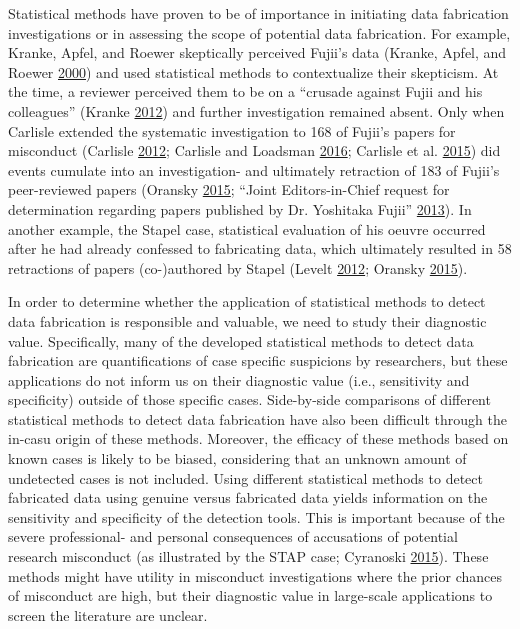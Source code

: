 \documentclass[a5paper]{book}
\begin{document}
Statistical methods have proven to be of importance in initiating data
fabrication investigations or in assessing the scope of potential data
fabrication. For example, Kranke, Apfel, and Roewer skeptically
perceived Fujii's data (Kranke, Apfel, and Roewer
\protect\hyperlink{ref-doi:10.1213ux2f00000539-200004000-00053}{2000})
and used statistical methods to contextualize their skepticism. At the
time, a reviewer perceived them to be on a \enquote{crusade against
Fujii and his colleagues} (Kranke
\protect\hyperlink{ref-doi:10.1111ux2fj.1365-2044.2012.07318.x}{2012})
and further investigation remained absent. Only when Carlisle extended
the systematic investigation to 168 of Fujii's papers for misconduct
(Carlisle
\protect\hyperlink{ref-doi:10.1111ux2fj.1365-2044.2012.07128.x}{2012};
Carlisle and Loadsman
\protect\hyperlink{ref-doi:10.1111ux2fanae.13650}{2016}; Carlisle et al.
\protect\hyperlink{ref-doi:10.1111ux2fanae.13126}{2015}) did events
cumulate into an investigation- and ultimately retraction of 183 of
Fujii's peer-reviewed papers (Oransky
\protect\hyperlink{ref-oransky2015}{2015}; ``Joint Editors-in-Chief
request for determination regarding papers published by Dr. Yoshitaka
Fujii''
\protect\hyperlink{ref-doi:10.1016ux2fj.ijoa.2012.10.001}{2013}). In
another example, the Stapel case, statistical evaluation of his oeuvre
occurred after he had already confessed to fabricating data, which
ultimately resulted in 58 retractions of papers (co-)authored by Stapel
(Levelt \protect\hyperlink{ref-Levelt2012}{2012}; Oransky
\protect\hyperlink{ref-oransky2015}{2015}).

In order to determine whether the application of statistical methods to
detect data fabrication is responsible and valuable, we need to study
their diagnostic value. Specifically, many of the developed statistical
methods to detect data fabrication are quantifications of case specific
suspicions by researchers, but these applications do not inform us on
their diagnostic value (i.e., sensitivity and specificity) outside of
those specific cases. Side-by-side comparisons of different statistical
methods to detect data fabrication have also been difficult through the
in-casu origin of these methods. Moreover, the efficacy of these methods
based on known cases is likely to be biased, considering that an unknown
amount of undetected cases is not included. Using different statistical
methods to detect fabricated data using genuine versus fabricated data
yields information on the sensitivity and specificity of the detection
tools. This is important because of the severe professional- and
personal consequences of accusations of potential research misconduct
(as illustrated by the STAP case; Cyranoski
\protect\hyperlink{ref-doi:10.1038ux2f520600a}{2015}). These methods
might have utility in misconduct investigations where the prior chances
of misconduct are high, but their diagnostic value in large-scale
applications to screen the literature are unclear.
\end{document}
